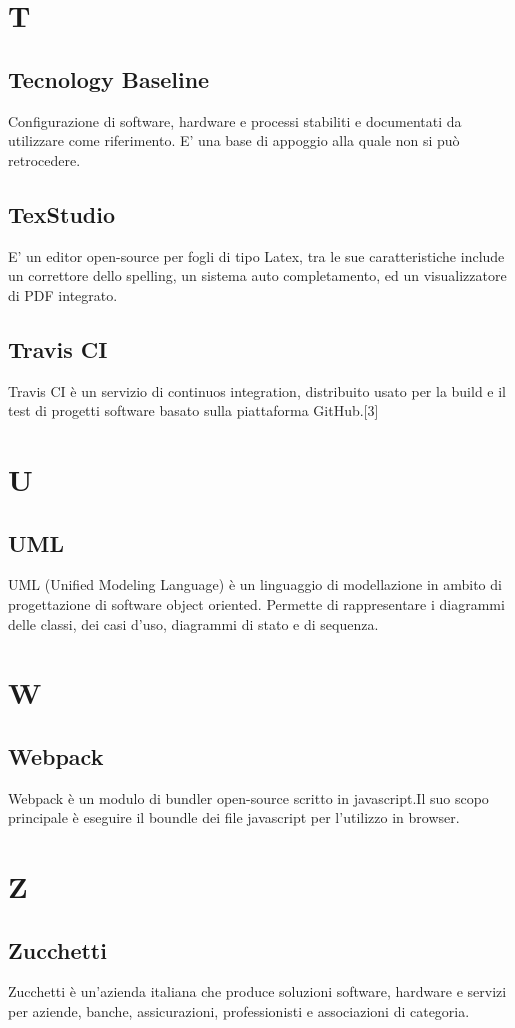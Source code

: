 \section{T}
    \subsection*{Tecnology Baseline}
Configurazione di software, hardware e processi stabiliti e documentati da utilizzare come riferimento. E’ una base di appoggio alla quale non si può retrocedere.
    \subsection*{TexStudio}
E’ un editor open-source per fogli di tipo Latex, tra le sue caratteristiche include un correttore dello spelling, un sistema auto completamento, ed un visualizzatore di  PDF integrato.
    \subsection*{Travis CI}
Travis CI è un servizio di continuos integration, distribuito usato per la build e il test di progetti software basato sulla piattaforma GitHub.[3]
\newpage

\section{U}
    \subsection*{UML}
UML (Unified Modeling Language) è un linguaggio di modellazione in ambito di progettazione di software object oriented. Permette di rappresentare i diagrammi delle classi, dei casi d’uso, diagrammi di stato e di sequenza.
\newpage

\section{W}
    \subsection*{Webpack}
Webpack è un modulo di bundler open-source scritto in javascript.Il suo scopo principale è eseguire il boundle dei file javascript per l'utilizzo in browser.
\newpage

\section{Z}
    \subsection*{Zucchetti}
Zucchetti è un’azienda italiana che produce soluzioni software, hardware e servizi per aziende, banche, assicurazioni, professionisti e associazioni di categoria.
\newpage